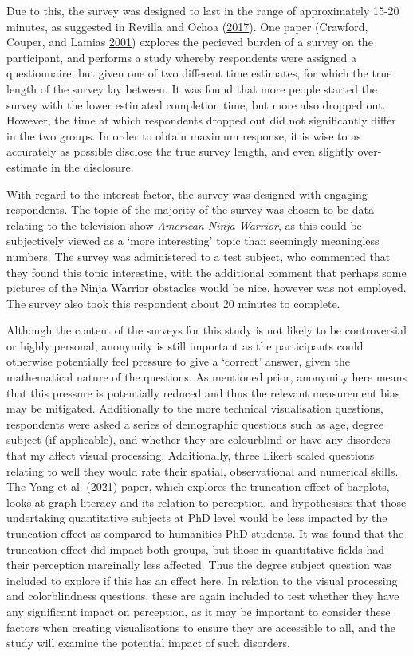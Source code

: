 \documentclass[
  11pt,
]{book}
\begin{document}
Due to this, the survey was designed to last in the range of
approximately 15-20 minutes, as suggested in Revilla and Ochoa
(\protect\hyperlink{ref-length}{2017}). One paper (Crawford, Couper, and
Lamias \protect\hyperlink{ref-burdenpercep}{2001}) explores the pecieved
burden of a survey on the participant, and performs a study whereby
respondents were assigned a questionnaire, but given one of two
different time estimates, for which the true length of the survey lay
between. It was found that more people started the survey with the lower
estimated completion time, but more also dropped out. However, the time
at which respondents dropped out did not significantly differ in the two
groups. In order to obtain maximum response, it is wise to as accurately
as possible disclose the true survey length, and even slightly
over-estimate in the disclosure.

With regard to the interest factor, the survey was designed with
engaging respondents. The topic of the majority of the survey was chosen
to be data relating to the television show
\textit{American Ninja Warrior}, as this could be subjectively viewed as
a `more interesting' topic than seemingly meaningless numbers. The
survey was administered to a test subject, who commented that they found
this topic interesting, with the additional comment that perhaps some
pictures of the Ninja Warrior obstacles would be nice, however was not
employed. The survey also took this respondent about 20 minutes to
complete.

Although the content of the surveys for this study is not likely to be
controversial or highly personal, anonymity is still important as the
participants could otherwise potentially feel pressure to give a
`correct' answer, given the mathematical nature of the questions. As
mentioned prior, anonymity here means that this pressure is potentially
reduced and thus the relevant measurement bias may be mitigated.
Additionally to the more technical visualisation questions, respondents
were asked a series of demographic questions such as age, degree subject
(if applicable), and whether they are colourblind or have any disorders
that my affect visual processing. Additionally, three Likert scaled
questions relating to well they would rate their spatial, observational
and numerical skills. The Yang et al.
(\protect\hyperlink{ref-YANG2021}{2021}) paper, which explores the
truncation effect of barplots, looks at graph literacy and its relation
to perception, and hypothesises that those undertaking quantitative
subjects at PhD level would be less impacted by the truncation effect as
compared to humanities PhD students. It was found that the truncation
effect did impact both groups, but those in quantitative fields had
their perception marginally less affected. Thus the degree subject
question was included to explore if this has an effect here. In relation
to the visual processing and colorblindness questions, these are again
included to test whether they have any significant impact on perception,
as it may be important to consider these factors when creating
visualisations to ensure they are accessible to all, and the study will
examine the potential impact of such disorders.
\end{document}
